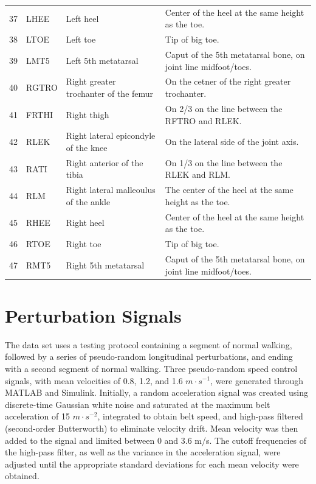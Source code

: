 \documentclass{article}
\begin{document}
\begin{table}
\begin{tabular}{rlll}
    37 & LHEE  & Left heel                             & Center of the heel at the same height as the toe. \\
    38 & LTOE  & Left toe                              & Tip of big toe. \\
    39 & LMT5  & Left 5th metatarsal                   & Caput of the 5th metatarsal bone, on joint line midfoot/toes. \\
    40 & RGTRO & Right greater trochanter of the femur & On the cetner of the right greater trochanter. \\
    41 & FRTHI & Right thigh                           & On 2/3 on the line between the RFTRO and RLEK. \\
    42 & RLEK  & Right lateral epicondyle of the knee  & On the lateral side of the joint axis. \\
    43 & RATI  & Right anterior of the tibia           & On 1/3 on the line between the RLEK and RLM. \\
    44 & RLM   & Right lateral malleoulus of the ankle & The center of the heel at the same height as the toe. \\
    45 & RHEE  & Right heel                            & Center of the heel at the same height as the toe. \\
    46 & RTOE  & Right toe                             & Tip of big toe. \\
    47 & RMT5  & Right 5th metatarsal                  & Caput of the 5th metatarsal bone, on joint line midfoot/toes. \\
    \bottomrule
  \end{tabular}
  \label{tab:marker-labels}
\end{table}

\section{Perturbation Signals}
%
The data set uses a testing protocol containing a segment of normal walking,
followed by a series of pseudo-random longitudinal perturbations, and ending
with a second segment of normal walking. Three pseudo-random speed control
signals, with mean velocities of 0.8, 1.2, and 1.6 $m \cdot s^{-1}$, were
generated through MATLAB and Simulink. Initially, a  random acceleration signal
was created using discrete-time Gaussian white noise and saturated at the maximum
belt acceleration of 15 $m \cdot s^{-2}$, integrated to obtain belt speed, and 
high-pass filtered (second-order Butterworth) to eliminate velocity drift. Mean 
velocity was then added to the signal and limited between 0 and 3.6 m/s. The 
cutoff frequencies of the high-pass filter, as well as the variance in the acceleration 
signal, were adjusted until the appropriate standard deviations for each mean 
velocity were obtained.
\end{document}
